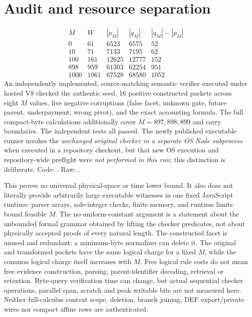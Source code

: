 \documentclass[11pt]{article}
\begin{document}
\section*{Audit and resource separation}
\[
\begin{array}{r|r|r|r|r}
M&W&|p_M|&|q_M|&|q_M|-|p_M|\\\hline
0&61&6523&6575&52\\
10&71&7133&7195&62\\
100&161&12625&12777&152\\
898&959&61303&62254&951\\
1000&1061&67528&68580&1052
\end{array}
\]
An independently implemented, source-matching semantic verifier executed under hosted V8 checked the authentic seed, 16 positive constructed packets across eight $M$ values, five negative corruptions (false facet, unknown gate, future parent, underpayment, wrong pivot), and the exact accounting formula. The full compact-byte calculations additionally cover $M=897,898,899$ and carry boundaries. The independent tests all passed. The newly published executable runner invokes the \emph{unchanged original checker in a separate OS Node subprocess} when executed in a repository checkout, but that new OS execution and repository-wide preflight were \emph{not performed in this run}; this distinction is deliberate. Code: . Raw: .

This proves no universal physical-space or time lower bound. It also does not literally provide arbitrarily large executable witnesses in one fixed JavaScript runtime: parser arrays, safe-integer checks, finite memory, and runtime limits bound feasible $M$. The no-uniform-constant argument is a statement about the unbounded formal grammar obtained by lifting the checker predicates, not about physically accepted proofs of every natural length. The constructed facet is unused and redundant: a minimum-byte normalizer can delete it. The original and transformed packets have the same logical charge for a fixed $M$, while the common logical charge itself increases with $M$. Free logical rule costs do not mean free evidence construction, parsing, parent-identifier decoding, retrieval or retention. Byte-query verification time can change, but actual sequential checker operations, parallel span, scratch and peak writable bits are not measured here. Neither full-calculus context scope, deletion, branch joining, DEF export/private wires nor compact affine rows are authenticated.
\end{document}
